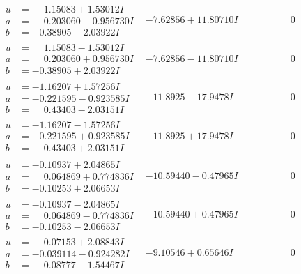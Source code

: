\documentclass[1p]{elsarticle_modified}
\theoremstyle{definition}
\begin{document}
$$\begin{array}{c|c|c}
\begin{aligned}
u &= \phantom{-}1.15083 + 1.53012 I \\
a &= \phantom{-}0.203060 - 0.956730 I \\
b &= -0.38905 - 2.03922 I\end{aligned}
 & -7.62856 + 11.80710 I & \phantom{-0.000000 } 0 \\ \hline\begin{aligned}
u &= \phantom{-}1.15083 - 1.53012 I \\
a &= \phantom{-}0.203060 + 0.956730 I \\
b &= -0.38905 + 2.03922 I\end{aligned}
 & -7.62856 - 11.80710 I & \phantom{-0.000000 } 0 \\ \hline\begin{aligned}
u &= -1.16207 + 1.57256 I \\
a &= -0.221595 - 0.923585 I \\
b &= \phantom{-}0.43403 - 2.03151 I\end{aligned}
 & -11.8925 - 17.9478 I & \phantom{-0.000000 } 0 \\ \hline\begin{aligned}
u &= -1.16207 - 1.57256 I \\
a &= -0.221595 + 0.923585 I \\
b &= \phantom{-}0.43403 + 2.03151 I\end{aligned}
 & -11.8925 + 17.9478 I & \phantom{-0.000000 } 0 \\ \hline\begin{aligned}
u &= -0.10937 + 2.04865 I \\
a &= \phantom{-}0.064869 + 0.774836 I \\
b &= -0.10253 + 2.06653 I\end{aligned}
 & -10.59440 - 0.47965 I & \phantom{-0.000000 } 0 \\ \hline\begin{aligned}
u &= -0.10937 - 2.04865 I \\
a &= \phantom{-}0.064869 - 0.774836 I \\
b &= -0.10253 - 2.06653 I\end{aligned}
 & -10.59440 + 0.47965 I & \phantom{-0.000000 } 0 \\ \hline\begin{aligned}
u &= \phantom{-}0.07153 + 2.08843 I \\
a &= -0.039114 - 0.924282 I \\
b &= \phantom{-}0.08777 - 1.54467 I\end{aligned}
 & -9.10546 + 0.65646 I & \phantom{-0.000000 } 0 \\ \hline\begin{aligned}

\end{aligned}
\end{array}$$
\end{document}
